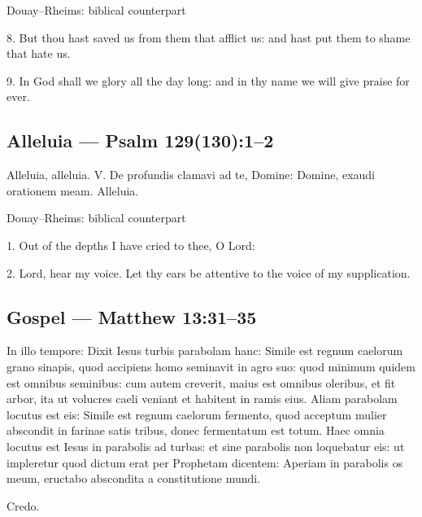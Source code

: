 \begin{englishwitness}{Douay--Rheims: biblical counterpart}

8. But thou hast saved us from them that afflict us: and hast put them to shame that hate us.

9. In God shall we glory all the day long: and in thy name we will give praise for ever.

\end{englishwitness}

\subsection{Alleluia --- Psalm 129(130):1–2}

\label{proper-alleluia}


\begin{latinproper}

Alleluia, alleluia. V. De profundis clamavi ad te, Domine: Domine, exaudi orationem meam. Alleluia.

\end{latinproper}

\begin{englishwitness}{Douay--Rheims: biblical counterpart}

1. Out of the depths I have cried to thee, O Lord:

2. Lord, hear my voice. Let thy ears be attentive to the voice of my supplication.

\end{englishwitness}

\subsection{Gospel --- Matthew 13:31–35}

\label{proper-gospel}


\begin{latinproper}

In illo tempore: Dixit Iesus turbis parabolam hanc: Simile est regnum caelorum grano sinapis, quod accipiens homo seminavit in agro suo: quod minimum quidem est omnibus seminibus: cum autem creverit, maius est omnibus oleribus, et fit arbor, ita ut volucres caeli veniant et habitent in ramis eius. Aliam parabolam locutus est eis: Simile est regnum caelorum fermento, quod acceptum mulier abscondit in farinae satis tribus, donec fermentatum est totum. Haec omnia locutus est Iesus in parabolis ad turbas: et sine parabolis non loquebatur eis: ut impleretur quod dictum erat per Prophetam dicentem: Aperiam in parabolis os meum, eructabo abscondita a constitutione mundi.

Credo.

\end{latinproper}

